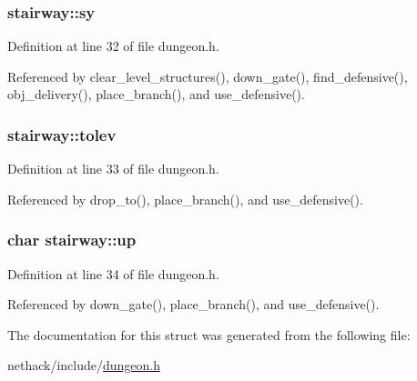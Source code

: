 \hypertarget{structstairway_a782c2bebca97b67e6299d2d5f8c2844f}{
\subsubsection[{sy}]{ stairway\+::sy}}\label{structstairway_a782c2bebca97b67e6299d2d5f8c2844f}


Definition at line 32 of file dungeon.\+h.



Referenced by clear\+\_\+level\+\_\+structures(), down\+\_\+gate(), find\+\_\+defensive(), obj\+\_\+delivery(), place\+\_\+branch(), and use\+\_\+defensive().

\hypertarget{structstairway_a6077e82bcb38b906ea0f10700a4d2273}{
\subsubsection[{tolev}]{ stairway\+::tolev}}\label{structstairway_a6077e82bcb38b906ea0f10700a4d2273}


Definition at line 33 of file dungeon.\+h.



Referenced by drop\+\_\+to(), place\+\_\+branch(), and use\+\_\+defensive().

\hypertarget{structstairway_a094992532e8ae225101143f2c57d6d1a}{
\subsubsection[{up}]{\setlength{\rightskip}{0pt plus 5cm}char stairway\+::up}}\label{structstairway_a094992532e8ae225101143f2c57d6d1a}


Definition at line 34 of file dungeon.\+h.



Referenced by down\+\_\+gate(), place\+\_\+branch(), and use\+\_\+defensive().



The documentation for this struct was generated from the following file\+:\begin{DoxyCompactItemize}
\item 
nethack/include/\hyperlink{dungeon_8h}{dungeon.\+h}\end{DoxyCompactItemize}
